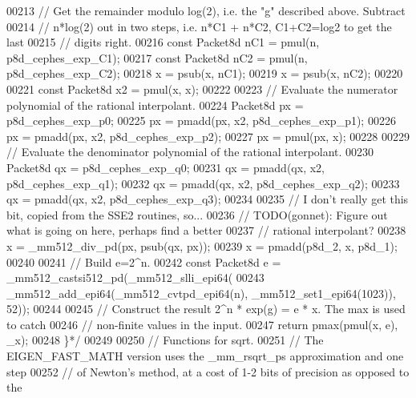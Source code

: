 \begin{DoxyCode}
00213 \textcolor{comment}{  // Get the remainder modulo log(2), i.e. the "g" described above. Subtract}
00214 \textcolor{comment}{  // n*log(2) out in two steps, i.e. n*C1 + n*C2, C1+C2=log2 to get the last}
00215 \textcolor{comment}{  // digits right.}
00216 \textcolor{comment}{  const Packet8d nC1 = pmul(n, p8d\_cephes\_exp\_C1);}
00217 \textcolor{comment}{  const Packet8d nC2 = pmul(n, p8d\_cephes\_exp\_C2);}
00218 \textcolor{comment}{  x = psub(x, nC1);}
00219 \textcolor{comment}{  x = psub(x, nC2);}
00220 \textcolor{comment}{}
00221 \textcolor{comment}{  const Packet8d x2 = pmul(x, x);}
00222 \textcolor{comment}{}
00223 \textcolor{comment}{  // Evaluate the numerator polynomial of the rational interpolant.}
00224 \textcolor{comment}{  Packet8d px = p8d\_cephes\_exp\_p0;}
00225 \textcolor{comment}{  px = pmadd(px, x2, p8d\_cephes\_exp\_p1);}
00226 \textcolor{comment}{  px = pmadd(px, x2, p8d\_cephes\_exp\_p2);}
00227 \textcolor{comment}{  px = pmul(px, x);}
00228 \textcolor{comment}{}
00229 \textcolor{comment}{  // Evaluate the denominator polynomial of the rational interpolant.}
00230 \textcolor{comment}{  Packet8d qx = p8d\_cephes\_exp\_q0;}
00231 \textcolor{comment}{  qx = pmadd(qx, x2, p8d\_cephes\_exp\_q1);}
00232 \textcolor{comment}{  qx = pmadd(qx, x2, p8d\_cephes\_exp\_q2);}
00233 \textcolor{comment}{  qx = pmadd(qx, x2, p8d\_cephes\_exp\_q3);}
00234 \textcolor{comment}{}
00235 \textcolor{comment}{  // I don't really get this bit, copied from the SSE2 routines, so...}
00236 \textcolor{comment}{  // TODO(gonnet): Figure out what is going on here, perhaps find a better}
00237 \textcolor{comment}{  // rational interpolant?}
00238 \textcolor{comment}{  x = \_mm512\_div\_pd(px, psub(qx, px));}
00239 \textcolor{comment}{  x = pmadd(p8d\_2, x, p8d\_1);}
00240 \textcolor{comment}{}
00241 \textcolor{comment}{  // Build e=2^n.}
00242 \textcolor{comment}{  const Packet8d e = \_mm512\_castsi512\_pd(\_mm512\_slli\_epi64(}
00243 \textcolor{comment}{      \_mm512\_add\_epi64(\_mm512\_cvtpd\_epi64(n), \_mm512\_set1\_epi64(1023)), 52));}
00244 \textcolor{comment}{}
00245 \textcolor{comment}{  // Construct the result 2^n * exp(g) = e * x. The max is used to catch}
00246 \textcolor{comment}{  // non-finite values in the input.}
00247 \textcolor{comment}{  return pmax(pmul(x, e), \_x);}
00248 \textcolor{comment}{  \}*/}
00249 
00250 \textcolor{comment}{// Functions for sqrt.}
00251 \textcolor{comment}{// The EIGEN\_FAST\_MATH version uses the \_mm\_rsqrt\_ps approximation and one step}
00252 \textcolor{comment}{// of Newton's method, at a cost of 1-2 bits of precision as opposed to the}

\end{DoxyCode}
